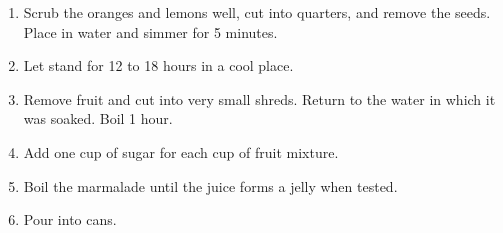 
\begin{ingredients}
\end{ingredients}


\begin{recipe}
  \begin{enumerate}

  \item Scrub the oranges and lemons well, cut into quarters, and
    remove the seeds.  Place in water and simmer for 5 minutes.

  \item Let stand for 12 to 18 hours in a cool place.

  \item Remove fruit and cut into very small shreds.  Return to the
    water in which it was soaked.  Boil 1 hour.

  \item Add one cup of sugar for each cup of fruit mixture.

  \item Boil the marmalade until the juice forms a jelly when tested.

  \item Pour into cans.

  \end{enumerate}
\end{recipe}

